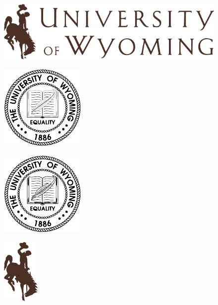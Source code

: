 \documentclass{article}
\begin{document}
\pagecolor{UWgold}
\begin{figure}[!hbtp]
\centering
    \includegraphics{./uw/uwlogo.pdf}
\end{figure}
\begin{figure}[!hbtp]
\centering
    \includegraphics{./uw/uwseal.pdf}
\end{figure}
\begin{figure}[!hbtp]
\centering
    \includegraphics{./uw/uwseal_nofill.pdf}
\end{figure}
\begin{figure}[!hbtp]
\centering
    \includegraphics{./uw/steamboat.pdf}
\end{figure}
\end{document}
